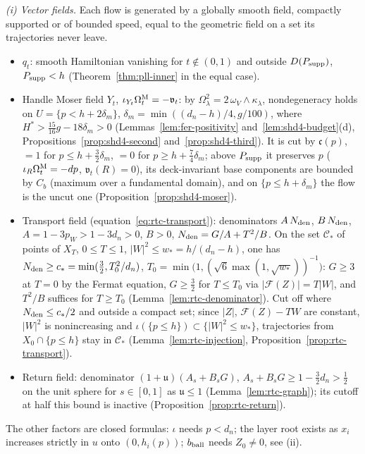 \emph{(i) Vector fields.} Each flow is generated by a globally smooth field, compactly supported or of bounded speed, equal to the geometric field on a set its trajectories never leave.
\begin{itemize}
\item $q_t$: smooth Hamiltonian vanishing for $t\notin(0,1)$ and outside $D(P_{\rm supp})$, $P_{\rm supp}<h$ (Theorem~\ref{thm:pll-inner} in the equal case).
\item Handle Moser field $Y_t$, $\iota_{Y_t}\Omega^{\rm M}_t=-\mathfrak v_t$: by $\Omega_\lambda^2=2\,\omega_V\wedge\kappa_\lambda$, nondegeneracy holds on $U=\{p<h+2\delta_m\}$, $\delta_m=\min((d_n-h)/4,g/100)$, where $H^*>\frac{15}{16}g-18\delta_m>0$ (Lemmas~\ref{lem:fer-positivity} and~\ref{lem:shd4-budget}(d), Propositions~\ref{prop:shd4-second} and~\ref{prop:shd4-third}). It is cut by $\mathfrak c(p)$, $=1$ for $p\le h+\frac32\delta_m$, $=0$ for $p\ge h+\frac74\delta_m$; above $P_{\rm supp}$ it preserves $p$ ($\iota_R\Omega^{\rm M}_t=-dp$, $\mathfrak v_t(R)=0$), its deck-invariant base components are bounded by $C_b$ (maximum over a fundamental domain), and on $\{p\le h+\delta_m\}$ the flow is the uncut one (Proposition~\ref{prop:shd4-moser}).
\item Transport field (equation~\ref{eq:rtc-transport}): denominators $A\,N_{\rm den}$, $B\,N_{\rm den}$, $A=1-3p_W>1-3d_n>0$, $B>0$, $N_{\rm den}=G/A+T^2/B$. On the set $\mathcal C_*$ of points of $X_T$, $0\le T\le1$, $|W|^2\le w_*=h/(d_n-h)$, one has $N_{\rm den}\ge c_*=\min(\frac32,T_0^2/d_n)$, $T_0=\min\bigl(1,(\sqrt6\max(1,\sqrt{w_*}))^{-1}\bigr)$: $G\ge3$ at $T=0$ by the Fermat equation, $G\ge\frac32$ for $T\le T_0$ via $|\mathcal F(Z)|=T|W|$, and $T^2/B$ suffices for $T\ge T_0$ (Lemma~\ref{lem:rtc-denominator}). Cut off where $N_{\rm den}\le c_*/2$ and outside a compact set; since $|Z|$, $\mathcal F(Z)-TW$ are constant, $|W|^2$ is nonincreasing and $\iota(\{p\le h\})\subset\{|W|^2\le w_*\}$, trajectories from $X_0\cap\{p\le h\}$ stay in $\mathcal C_*$ (Lemma~\ref{lem:rtc-injection}, Proposition~\ref{prop:rtc-transport}).
\item Return field: denominator $(1+\mathfrak u)(A_s+B_sG)$, $A_s+B_sG\ge1-\frac32d_n>\frac12$ on the unit sphere for $s\in[0,1]$ as $\mathfrak u\le1$ (Lemma~\ref{lem:rtc-graph}); its cutoff at half this bound is inactive (Proposition~\ref{prop:rtc-return}).
\end{itemize}
The other factors are closed formulas: $\iota$ needs $p<d_n$; the layer root exists as $x_i$ increases strictly in $u$ onto $(0,h_i(p))$; $b_{\rm ball}$ needs $Z_0\ne0$, see (ii).

